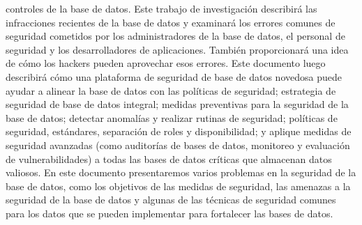 controles de la base de datos. Este trabajo de investigación describirá las infracciones recientes de la base de datos y examinará los errores comunes de seguridad cometidos por los administradores de la base de datos, el personal de seguridad y los desarrolladores de aplicaciones. También proporcionará una idea de cómo los hackers pueden aprovechar esos errores. Este documento luego describirá cómo una plataforma de seguridad de base de datos novedosa puede ayudar a alinear la base de datos con las políticas de seguridad; estrategia de seguridad de base de datos integral; medidas preventivas para la seguridad de la base de datos; detectar anomalías y realizar rutinas de seguridad; políticas de seguridad, estándares, separación de roles y disponibilidad; y aplique medidas de seguridad avanzadas (como auditorías de bases de datos, monitoreo y evaluación de vulnerabilidades) a todas las bases de datos críticas que almacenan datos valiosos. En este documento presentaremos varios problemas en la seguridad de la base de datos, como los objetivos de las medidas de seguridad, las amenazas a la seguridad de la base de datos y algunas de las técnicas de seguridad comunes para los datos que se pueden implementar para fortalecer las bases de datos.